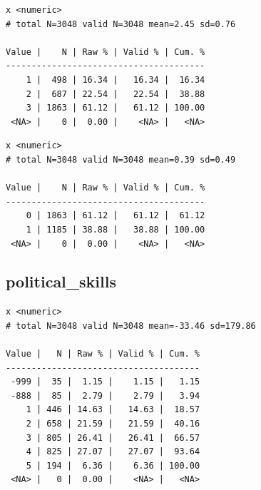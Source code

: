\documentclass[
  letterpaper,
  DIV=11,
  numbers=noendperiod]{scrreprt}
\newenvironment{Shaded}{\begin{snugshade}}{\end{snugshade}}
\newcommand{\FunctionTok}[1]{\textcolor[rgb]{0.28,0.35,0.67}{#1}}
\newcommand{\NormalTok}[1]{\textcolor[rgb]{0.00,0.23,0.31}{#1}}
\newcommand{\SpecialCharTok}[1]{\textcolor[rgb]{0.37,0.37,0.37}{#1}}
\begin{document}
\begin{verbatim}
x <numeric> 
# total N=3048 valid N=3048 mean=2.45 sd=0.76

Value |    N | Raw % | Valid % | Cum. %
---------------------------------------
    1 |  498 | 16.34 |   16.34 |  16.34
    2 |  687 | 22.54 |   22.54 |  38.88
    3 | 1863 | 61.12 |   61.12 | 100.00
 <NA> |    0 |  0.00 |    <NA> |   <NA>
\end{verbatim}

\begin{Shaded}
\end{Shaded}

\begin{verbatim}
x <numeric> 
# total N=3048 valid N=3048 mean=0.39 sd=0.49

Value |    N | Raw % | Valid % | Cum. %
---------------------------------------
    0 | 1863 | 61.12 |   61.12 |  61.12
    1 | 1185 | 38.88 |   38.88 | 100.00
 <NA> |    0 |  0.00 |    <NA> |   <NA>
\end{verbatim}

\hypertarget{political_skills}{%
\subsection{political\_skills}\label{political_skills}}

\begin{Shaded}
\end{Shaded}

\begin{verbatim}
x <numeric> 
# total N=3048 valid N=3048 mean=-33.46 sd=179.86

Value |   N | Raw % | Valid % | Cum. %
--------------------------------------
 -999 |  35 |  1.15 |    1.15 |   1.15
 -888 |  85 |  2.79 |    2.79 |   3.94
    1 | 446 | 14.63 |   14.63 |  18.57
    2 | 658 | 21.59 |   21.59 |  40.16
    3 | 805 | 26.41 |   26.41 |  66.57
    4 | 825 | 27.07 |   27.07 |  93.64
    5 | 194 |  6.36 |    6.36 | 100.00
 <NA> |   0 |  0.00 |    <NA> |   <NA>
\end{verbatim}

\begin{Shaded}
\end{Shaded}
\end{document}
